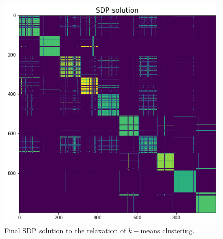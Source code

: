 \documentclass{article}
\begin{document}
\begin{figure}[ht]
    \centering
    \includegraphics[width=.5\textwidth]{4-frank_wolfe/part3/sdp.png}
    \caption{Final SDP solution to the relaxation of $k-$means clustering.}
    \label{fig:sdp}
\end{figure}
\end{document}
